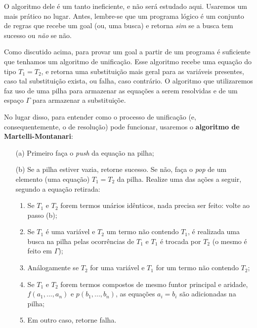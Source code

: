 \documentclass{article}
\theoremstyle{remark}
\theoremstyle{theorem}
\begin{document}
O algoritmo dele é um tanto ineficiente, e não será estudado aqui. Usaremos um mais prático no lugar. Antes, lembre-se que um programa lógico é um conjunto de regras que recebe um goal (ou, uma busca) e retorna {\it sim} se a busca tem sucesso ou {\it não} se não.

Como discutido acima, para provar um goal a partir de um programa é suficiente que tenhamos um algoritmo de unificação. Esse algoritmo recebe uma equação do tipo $T_1 = T_2$, e retorna uma substituição mais geral para as variáveis presentes, caso tal substituição exista, ou falha, caso contrário. O algoritmo que utilizaremos faz uso de uma pilha para armazenar as equações a serem resolvidas e de um espaço $\Gamma$ para armazenar a substituiçõe.

No lugar disso, para entender como o processo de unificação (e, consequentemente, o de resolução) pode funcionar, usaremos o \textbf{algoritmo de Martelli-Montanari}:
\vspace{0.5cm}

\begin{itemize}
    \item[(a)] Primeiro faça o \textit{push} da equação na pilha;
    \item[(b)] Se a pilha estiver vazia, retorne sucesso. Se não, faça o \textit{pop} de um elemento (uma equação) $T_1 = T_2$ da pilha. Realize uma das ações a seguir, segundo a equação retirada:
      \begin{enumerate}
        \item Se $T_1$ e $T_2$ forem termos unários idênticos, nada precisa ser feito: volte ao passo (b);
        \item Se $T_1$ é uma variável e $T_2$ um termo não contendo $T_1$, é realizada uma busca na pilha pelas ocorrências de $T_1$ e $T_1$ é trocada por $T_2$ (o mesmo é feito em $\Gamma$);
        \item Análogamente se $T_2$ for uma variável e $T_1$ for um termo não contendo $T_2$;
        \item Se $T_1$ e $T_2$ forem termos compostos de mesmo funtor principal e aridade, $f(a_1, ..., a_n)$ e $p(b_1, ..., b_n)$, as equações $a_i = b_i$ são adicionadas na pilha;
        \item Em outro caso, retorne falha.
      \end{enumerate}
\end{itemize}
\end{document}
